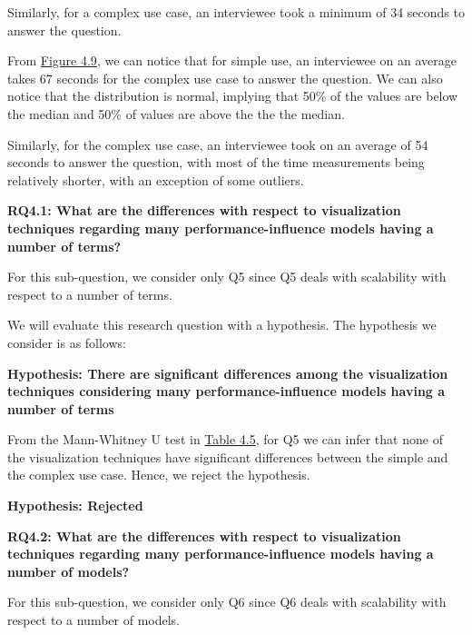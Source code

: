 \begin{description}[leftmargin=0pt]
\begin{description}[leftmargin=0pt]
Similarly, for a complex use case, an interviewee took a minimum of 34 seconds to answer the question.

\item[The ratio Plot: ]From \hyperref[scalabilityRatio]{Figure 4.9}, we can notice that for simple use, an interviewee on an average takes 67 seconds for the complex use case to answer the question. We can also notice that the distribution is normal, implying that 50\% of the values are below the median and 50\% of values are above the the the median. 

Similarly, for the complex use case, an interviewee took on an average of 54 seconds to answer the question, with most of the time measurements being relatively shorter, with an exception of some outliers.
\end{description}

\begin{mdframed}
\textbf{RQ4.1: What are the differences with respect to visualization techniques regarding many performance-influence models having a number of terms?}
\end{mdframed}

For this sub-question, we consider only Q5 since Q5 deals with scalability with respect to a number of terms.

We will evaluate this research question with a hypothesis. The hypothesis we consider is as follows:

\begin{mdframed}
\textbf {Hypothesis: There are significant differences among the visualization techniques considering many performance-influence models having a number of terms}
\end{mdframed}

From the Mann-Whitney U test in \hyperref[table:q5q6MannWhitney]{Table 4.5}, for Q5 we can infer that none of the visualization techniques have significant differences between the simple and the complex use case. Hence, we reject the hypothesis.

\begin{mdframed}
\textbf {Hypothesis: Rejected}
\end{mdframed}

\begin{mdframed}
\textbf{RQ4.2: What are the differences with respect to visualization techniques regarding many performance-influence models having a number of models?}
\end{mdframed}

For this sub-question, we consider only Q6 since Q6 deals with scalability with respect to a number of models.


\end{description}
